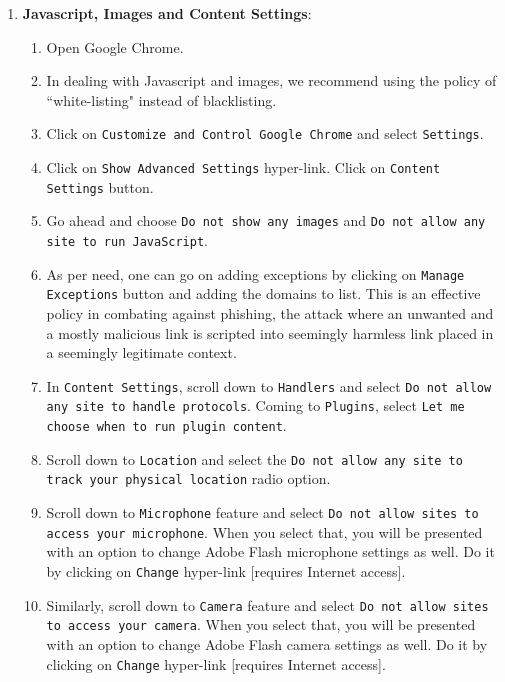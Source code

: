 \documentclass[12pt]{extarticle}
\begin{document}
\begin{enumerate}
	
	\vspace{2mm}
	\noindent
	\item	\textbf{Javascript, Images and Content Settings}:
	\begin{enumerate}
		\item Open Google Chrome.
		\item In dealing with Javascript and images, we recommend using the policy of ``white-listing" instead of blacklisting.
		\item { Click on \texttt{Customize and Control Google Chrome} and select \texttt{Settings}.}
		\item Click on \texttt{Show Advanced Settings} hyper-link. Click on \texttt{Content Settings} button. 
		\item Go ahead and choose \texttt{Do not show any images} and \texttt{Do not allow any site to run JavaScript}.
		\item As per need, one can go on adding exceptions by clicking on \texttt{Manage Exceptions} button and adding the domains to list. This is an effective policy in combating against phishing, the attack where an unwanted and a mostly malicious link is scripted into seemingly harmless link placed in a seemingly legitimate context. 
		\item In \texttt{Content Settings}, scroll down to \texttt{Handlers} and select \texttt{Do not allow any site to handle protocols}. Coming to \texttt{Plugins}, select \texttt{Let me choose when to run plugin content}. 
		\item Scroll down to \texttt{Location} and select the \texttt{Do not allow any site to track your physical location} radio option. 
		\item Scroll down to \texttt{Microphone} feature and select \texttt{Do not allow sites to access your microphone}. When you select that, you will be presented with an option to change Adobe Flash microphone settings as well. Do it by clicking on \texttt{Change} hyper-link [requires Internet access]. 
		\item Similarly, scroll down to \texttt{Camera} feature and select \texttt{Do not allow sites to access your camera}. When you select that, you will be presented with an option to change Adobe Flash camera settings as well. Do it by clicking on \texttt{Change} hyper-link [requires Internet access]. 
	\end{enumerate}
	

\end{enumerate}
\end{document}
